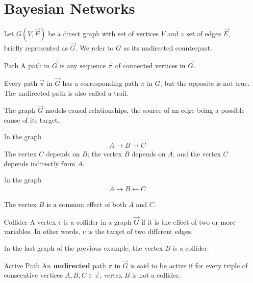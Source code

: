 \chapter{Bayesian Networks}\label{app:bayesian-network}

Let $G(V,\vec{E})$ be a direct graph with set of vertices $V$ and a set of edges $\vec{E}$, briefly represented as $\vec{G}$. We refer to $G$ as its undirected counterpart.

\begin{definition}{Path}
A path in $\vec{G}$ is any sequence $\vec{\pi}$ of connected vertices in $\vec{G}$.
\end{definition}

\begin{example}
Every path $\vec{\pi}$ in $\vec{G}$ has a corresponding path $\pi$ in $G$, but the opposite is not true. The undirected path is also called a trail.
\end{example}

The graph $\vec{G}$ models causal relationships, the source of an edge being a possible cause of its target.

\begin{example}
In the graph 
\begin{align*}
A\rightarrow B \rightarrow C
\end{align*}
The vertex $C$ depends on $B$; the vertex $B$ depends on $A$; and the vertex $C$ depends indirectly from $A$.

In the graph
\begin{align*}
A\rightarrow B \leftarrow C
\end{align*}

The vertex $B$ is a common effect of both $A$ and $C$.

\end{example}

\begin{definition}{Collider}
A vertex $v$ is a collider in a graph $\vec{G}$ if it is the effect of two or more variables. In other words, $v$ is the target of two different edges.
\end{definition}

\begin{example}
In the last graph of the previous example, the vertex $B$ is a collider.
\end{example}

\begin{definition}{Active Path}
An \textbf{undirected} path $\pi$ in $\vec{G}$ is said to be active if for every triple of consecutive vertices $A,B,C \in \vec{\pi}$, vertex $B$ is not a collider.
\end{definition}

